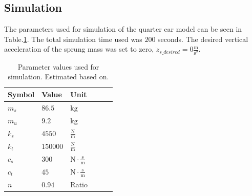 \subsection{Simulation}

The parameters used for simulation of the quarter car model can be seen in Table.\:\ref{tab:parameters}. The total simulation time used was $200$ seconds. The desired vertical acceleration of the sprung mass was set to zero, $\ddot{z}_{s\_desired} = 0 \frac{\text{m}}{\text{s}^2}$.
\begin{table}[ht]
	\centering
	\begin{tabular}{|l|l|l|l|l|l|}
			\hline
			Symbol       & Value     & Unit                                         \\
			\hline
			$m_s$        & $86.5$    & $\text{kg}$                                  \\
			$m_u$        & $9.2$     & $\text{kg}$                                  \\
            $k_s$        & $4550$    & $\frac{\text{N}}{\text{m}}$                  \\
            $k_t$        & $150000$  & $\frac{\text{N}}{\text{m}}$                  \\
            $c_s$        & $300$     & $\text{N}\cdot\frac{\text{s}}{\text{m}}$     \\
            $c_t$        & $45$      & $\text{N}\cdot\frac{\text{s}}{\text{m}}$     \\
            $n$          & $0.94$    & Ratio                                        \\
			\hline
		\end{tabular}
	\caption{Parameter values used for simulation. Estimated based on\:\cite{mdhsolarteamBillMaterials}\cite{cfw16inchTypeC}.}
	\label{tab:parameters}
\end{table}

